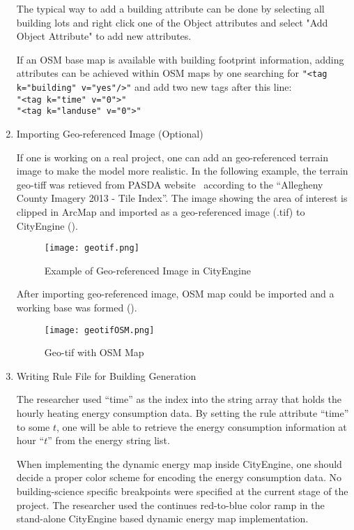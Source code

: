 \begin{enumerate}[1)]
  The typical way to add a building attribute can be done by selecting
  all building lots and right click one of the Object attributes and
  select "Add Object Attribute" to add new attributes.

  If an OSM base map is available with building footprint information,
  adding attributes can be achieved within OSM maps by one searching
  for \texttt{"<tag k="building" v="yes"/>"} and add two new tags
  after this line:\\
  \texttt{"<tag k="time" v="0"\/>"}\\
  \texttt{"<tag k="landuse" v="0"\/>"}\\

\item{Importing Geo-referenced Image (Optional)}

  If one is working on a real project, one can add an geo-referenced
  terrain image to make the model more realistic. In the following
  example, the terrain geo-tiff was retieved from PASDA
  website~\cite{PASDAImagery2013} according to the ``Allegheny County
  Imagery 2013 - Tile Index''. The image showing the area of interest
  is clipped in ArcMap and imported as a geo-referenced image (.tif)
  to CityEngine ().

  \begin{figure}[h!]
    \centering
    \texttt{[image: geotif.png]}
    \caption[Geo-tif in CityEngine]{Example of Geo-referenced Image in
      CityEngine}
    \label{fig:geotif}
  \end{figure}

  After importing geo-referenced image, OSM map could be imported and
  a working base was formed ().
  \begin{figure}[h!]
    \centering
    \texttt{[image: geotifOSM.png]}
    \caption[Geo-tif with OSM Map]{Geo-tif with OSM Map}
    \label{fig:geotifOSM}
  \end{figure}

\item{Writing Rule File for Building Generation}

  The researcher used ``time'' as the index into the string array that
  holds the hourly heating energy consumption data. By setting the
  rule attribute ``time'' to some $t$, one will be able to retrieve
  the energy consumption information at hour ``$t$'' from the energy
  string list.

  When implementing the dynamic energy map inside CityEngine, one
  should decide a proper color scheme for encoding the energy
  consumption data. No building-science specific breakpoints were
  specified at the current stage of the project. The researcher used
  the continues red-to-blue color ramp in the stand-alone CityEngine
  based dynamic energy map implementation.


\end{enumerate}
